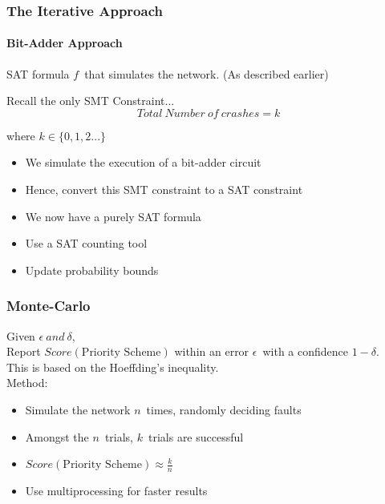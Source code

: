 \documentclass{beamer}
\begin{document}
\begin{frame}
\frametitle{The Iterative Approach}
\framesubtitle{Bit-Adder Approach}
	SAT formula $ f $\ that simulates the network. (As described earlier)\\[1ex]
	\begin{block}{Recall the only SMT Constraint...}
	$$Total\ Number\ of\ crashes = k$$
	\begin{flushright}
		where $k\in\{0,1,2...\}$
	\end{flushright}
	\end{block}

	\pause

	\begin{itemize}
	\item We simulate the execution of a bit-adder circuit
	\item Hence, convert this SMT constraint to a SAT constraint
	\item We now have a purely SAT formula
	\item Use a SAT counting tool
	\item Update probability bounds
	\end{itemize}
\end{frame}

\begin{frame}
\frametitle{Monte-Carlo}
	Given $\epsilon \ and\ \delta$,\\
	Report $Score(\text{Priority Scheme})$ within an error $\epsilon$\ with a confidence $1-\delta$.\\[2ex]
	This is based on the Hoeffding's inequality.\\[2ex]
	Method:
	\begin{itemize}
	\item Simulate the network $n$\ times, randomly deciding faults
	\item Amongst the $n$\ trials, $k$\ trials are successful
	\item $Score(\text{Priority Scheme}) \approx \frac{k}{n}$
	\item Use multiprocessing for faster results
	\end{itemize}
\end{frame}
\end{document}
